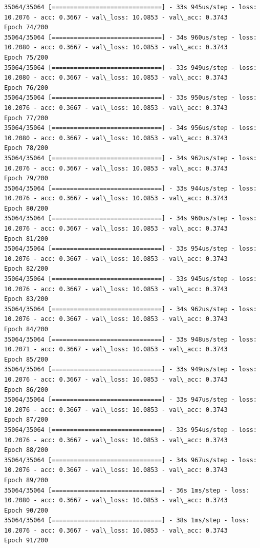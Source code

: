 \documentclass[11pt]{article}
\begin{document}
\begin{Verbatim}[commandchars=\\\{\}]
35064/35064 [==============================] - 33s 945us/step - loss: 10.2076 - acc: 0.3667 - val\_loss: 10.0853 - val\_acc: 0.3743
Epoch 74/200
35064/35064 [==============================] - 34s 960us/step - loss: 10.2080 - acc: 0.3667 - val\_loss: 10.0853 - val\_acc: 0.3743
Epoch 75/200
35064/35064 [==============================] - 33s 949us/step - loss: 10.2080 - acc: 0.3667 - val\_loss: 10.0853 - val\_acc: 0.3743
Epoch 76/200
35064/35064 [==============================] - 33s 950us/step - loss: 10.2076 - acc: 0.3667 - val\_loss: 10.0853 - val\_acc: 0.3743
Epoch 77/200
35064/35064 [==============================] - 34s 956us/step - loss: 10.2080 - acc: 0.3667 - val\_loss: 10.0853 - val\_acc: 0.3743
Epoch 78/200
35064/35064 [==============================] - 34s 962us/step - loss: 10.2076 - acc: 0.3667 - val\_loss: 10.0853 - val\_acc: 0.3743
Epoch 79/200
35064/35064 [==============================] - 33s 944us/step - loss: 10.2076 - acc: 0.3667 - val\_loss: 10.0853 - val\_acc: 0.3743
Epoch 80/200
35064/35064 [==============================] - 34s 960us/step - loss: 10.2076 - acc: 0.3667 - val\_loss: 10.0853 - val\_acc: 0.3743
Epoch 81/200
35064/35064 [==============================] - 33s 954us/step - loss: 10.2076 - acc: 0.3667 - val\_loss: 10.0853 - val\_acc: 0.3743
Epoch 82/200
35064/35064 [==============================] - 33s 945us/step - loss: 10.2076 - acc: 0.3667 - val\_loss: 10.0853 - val\_acc: 0.3743
Epoch 83/200
35064/35064 [==============================] - 34s 962us/step - loss: 10.2076 - acc: 0.3667 - val\_loss: 10.0853 - val\_acc: 0.3743
Epoch 84/200
35064/35064 [==============================] - 33s 948us/step - loss: 10.2071 - acc: 0.3667 - val\_loss: 10.0853 - val\_acc: 0.3743
Epoch 85/200
35064/35064 [==============================] - 33s 949us/step - loss: 10.2076 - acc: 0.3667 - val\_loss: 10.0853 - val\_acc: 0.3743
Epoch 86/200
35064/35064 [==============================] - 33s 947us/step - loss: 10.2076 - acc: 0.3667 - val\_loss: 10.0853 - val\_acc: 0.3743
Epoch 87/200
35064/35064 [==============================] - 33s 954us/step - loss: 10.2076 - acc: 0.3667 - val\_loss: 10.0853 - val\_acc: 0.3743
Epoch 88/200
35064/35064 [==============================] - 34s 967us/step - loss: 10.2076 - acc: 0.3667 - val\_loss: 10.0853 - val\_acc: 0.3743
Epoch 89/200
35064/35064 [==============================] - 36s 1ms/step - loss: 10.2080 - acc: 0.3667 - val\_loss: 10.0853 - val\_acc: 0.3743
Epoch 90/200
35064/35064 [==============================] - 38s 1ms/step - loss: 10.2076 - acc: 0.3667 - val\_loss: 10.0853 - val\_acc: 0.3743
Epoch 91/200

\end{Verbatim}
\end{document}
